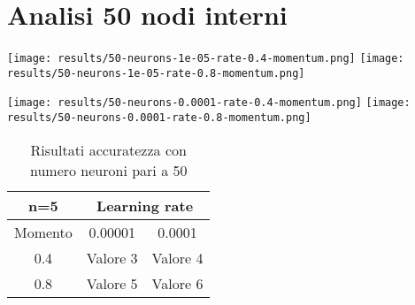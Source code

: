 \section{Analisi 50 nodi interni}
\begin{center}
\texttt{[image: results/50-neurons-1e-05-rate-0.4-momentum.png]}
\texttt{[image: results/50-neurons-1e-05-rate-0.8-momentum.png]}
\end{center}

\begin{center}
\texttt{[image: results/50-neurons-0.0001-rate-0.4-momentum.png]}
\texttt{[image: results/50-neurons-0.0001-rate-0.8-momentum.png]}
\end{center}
\begin{table}[htbp]
    \centering
    \begin{tabular}{|c|c|c|}
    \hline
    n=5 & \multicolumn{2}{c|}{Learning rate} \\
    \hline
    Momento & 0.00001 & 0.0001 \\
    \hline
    0.4 & Valore 3 & Valore 4 \\
    \hline
    0.8 & Valore 5 & Valore 6 \\
    \hline
    \end{tabular}
    \caption{Risultati accuratezza con numero neuroni pari a 50}
\end{table}

{\clearpage}
